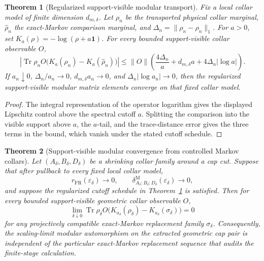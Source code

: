 \documentclass[11pt]{article}
\newtheorem{theorem}{Theorem}[section]
\begin{document}
\begin{theorem}[Regularized support-visible modular transport]\label{thm:regularized-modular-transport}
Fix a local collar model of finite dimension \(d_{m,\delta}\). Let \(\rho_n\) be the transported physical collar marginal, \(\widehat\rho_n\) the exact-Markov comparison marginal, and \(\Delta_n=\|\rho_n-\widehat\rho_n\|_1\). For \(a>0\), set \(K_a(\rho)=-\log(\rho+a\mathbf 1)\). For every bounded support-visible collar observable \(O\),
\[
\left|\operatorname{Tr}\rho_n O\bigl(K_a(\rho_n)-K_a(\widehat\rho_n)\bigr)\right|
\le
\|O\|\left(\frac{4\Delta_n}{a}+d_{m,\delta}a+4\Delta_n|\log a|\right).
\]
If \(a_n\downarrow0\), \(\Delta_n/a_n\to0\), \(d_{m,\delta}a_n\to0\), and \(\Delta_n|\log a_n|\to0\), then the regularized support-visible modular matrix elements converge on that fixed collar model.
\end{theorem}

\begin{proof}
The integral representation of the operator logarithm gives the displayed Lipschitz control above the spectral cutoff \(a\). Splitting the comparison into the visible support above \(a\), the \(a\)-tail, and the trace-distance error gives the three terms in the bound, which vanish under the stated cutoff schedule.
\end{proof}

\begin{theorem}[Support-visible modular convergence from controlled Markov collars]\label{thm:support-visible-modular-convergence}
Let \((A_\delta,B_\delta,D_\delta)\) be a shrinking collar family around a cap
cut. Suppose that after pullback to every fixed local collar model,
\[
r_{\mathrm{FR}}(\varepsilon_\delta)\to0,\qquad
\delta^{\mathrm M}_{A_\delta:B_\delta:D_\delta}(\varepsilon_\delta)\to0,
\]
and suppose the regularized cutoff schedule in
Theorem~\ref{thm:regularized-modular-transport} is satisfied. Then for every
bounded support-visible geometric collar observable \(O\),
\[
\lim_{\delta\downarrow0}
\operatorname{Tr}\rho_\delta O
\bigl(
K_{a_\delta}(\rho_\delta)-K_{a_\delta}(\sigma_\delta)
\bigr)
=0
\]
for any projectively compatible exact-Markov replacement family
\(\sigma_\delta\). Consequently, the scaling-limit modular automorphism on the
extracted geometric cap pair is independent of the particular exact-Markov
replacement sequence that audits the finite-stage calculation.
\end{theorem}
\end{document}
